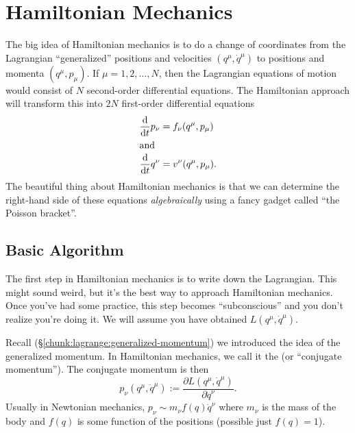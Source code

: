 \section{Hamiltonian Mechanics}

The big idea of Hamiltonian mechanics is to do a change of coordinates
from the Lagrangian ``generalized'' positions and velocities
$(q^{\mu},\dot{q}^{\mu})$ to positions and momenta $(q^{\mu}, p_{\mu})$.
If $\mu=1,2,\dots,N$, then the Lagrangian equations of motion would
consist of $N$ second-order differential equations. The Hamiltonian
approach will transform this into $2N$ first-order differential
equations
\begin{subequations}
\begin{align}
\frac{\mathrm{d}}{\mathrm{d} t}p_{\nu} &= f_{\nu}(q^{\mu},p_{\mu})\\
\intertext{and}
\frac{\mathrm{d}}{\mathrm{d} t}q^{\nu} &= v^{\nu}(q^{\mu},p_{\mu}).
\end{align}
\end{subequations}
The beautiful thing about Hamiltonian mechanics is that we can determine
the right-hand side of these equations \emph{algebraically} using a
fancy gadget called ``the Poisson bracket''.

\subsection{Basic Algorithm}

The first step in Hamiltonian mechanics is to write down the
Lagrangian. This might sound weird, but it's the best way to approach
Hamiltonian mechanics. Once you've had some practice, this step becomes
``subconscious'' and you don't realize you're doing it. We will assume
you have obtained $L(q^{\mu}, \dot{q}^{\mu})$.

Recall (\S\ref{chunk:lagrange:generalized-momentum}) we introduced the
idea of the generalized momentum. In Hamiltonian mechanics, we call it
the  (or ``conjugate momentum''). The
conjugate momentum is then
\begin{equation}
p_{\nu}(q^{\mu},\dot{q}^{\mu}) := \frac{\partial L(q^{\mu},\dot{q}^{\mu})}{\partial\dot{q}^{\nu}}.
\end{equation}
Usually in Newtonian mechanics, $p_{\nu}\sim m_{\nu} f(q)\dot{q}^{\nu}$ where
$m_{\nu}$ is the mass of the body and $f(q)$ is some function of the
positions (possible just $f(q)=1$).

